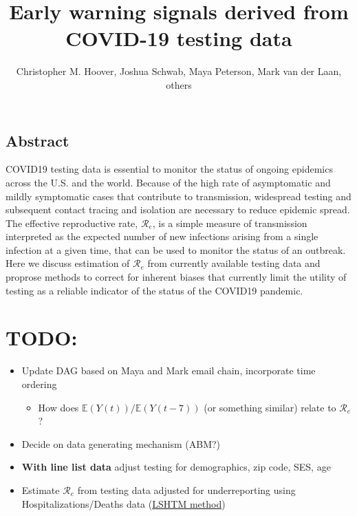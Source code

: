 \documentclass[
]{article}
\title{Early warning signals derived from COVID-19 testing data}
\author{Christopher M. Hoover, Joshua Schwab, Maya Peterson, Mark van der Laan,
others}
\date{}
\providecommand{\tightlist}{%
  \setlength{\itemsep}{0pt}\setlength{\parskip}{0pt}}
\begin{document}
\maketitle

\hypertarget{abstract}{%
\subsection{Abstract}\label{abstract}}

COVID19 testing data is essential to monitor the status of ongoing
epidemics across the U.S. and the world. Because of the high rate of
asymptomatic and mildly symptomatic cases that contribute to
transmission, widespread testing and subsequent contact tracing and
isolation are necessary to reduce epidemic spread. The effective
reproductive rate, \(\mathcal{R}_e\), is a simple measure of
transmission interpreted as the expected number of new infections
arising from a single infection at a given time, that can be used to
monitor the status of an outbreak. Here we discuss estimation of
\(\mathcal{R}_e\) from currently available testing data and proprose
methods to correct for inherent biases that currently limit the utility
of testing as a reliable indicator of the status of the COVID19
pandemic.

\hypertarget{todo}{%
\section{TODO:}\label{todo}}

\begin{itemize}
\tightlist
\item
  Update DAG based on Maya and Mark email chain, incorporate time
  ordering

  \begin{itemize}
  \tightlist
  \item
    How does \(\mathbb{E}(Y(t))/\mathbb{E}(Y(t-7))\) (or something
    similar) relate to \(\mathcal{R}_e\)?\\
  \end{itemize}
\item
  Decide on data generating mechanism (ABM?)\\
\item
  \textbf{With line list data} adjust testing for demographics, zip
  code, SES, age\\
\item
  Estimate \(\mathcal{R}_e\) from testing data adjusted for
  underreporting using Hospitalizations/Deaths data
  (\href{https://cmmid.github.io/topics/covid19/global_cfr_estimates.html}{LSHTM
  method})
\end{itemize}
\end{document}
